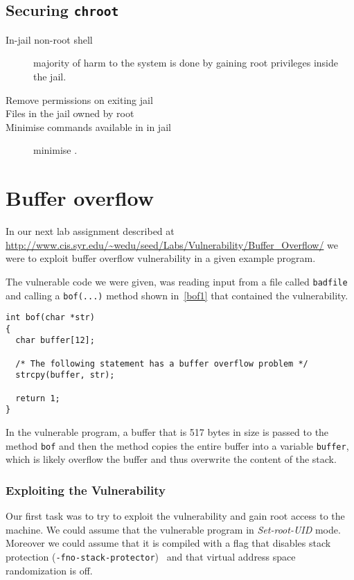 \documentclass[12pt, a4paper, pdflatex]{article}
\begin{document}
\subsection{Securing \texttt{chroot}}
\begin{description}
  \item[In-jail non-root shell] majority of harm to the system is done by gaining root privileges inside the jail.
  \item[Remove permissions on exiting jail] 
  \item[Files in the jail owned by root] 
  \item[Minimise commands available in in jail] minimise .
\end{description}

\section{Buffer overflow}

In our next lab assignment described at \url{http://www.cis.syr.edu/~wedu/seed/Labs/Vulnerability/Buffer_Overflow/} we were to exploit buffer overflow vulnerability in a given example program.

The vulnerable code we were given, was reading input from a file called \texttt{badfile} and calling a \texttt{bof(...)} method shown in~\ref{bof1} that contained the vulnerability.

\vspace{1em}
\lstset{
	captionpos=b,
	frame=single,
	language=C,
	breaklines=true,
	caption=Function with buffer overflow vulnerability,
	label=bof1,
}
\begin{lstlisting}
int bof(char *str)
{
  char buffer[12];

  /* The following statement has a buffer overflow problem */ 
  strcpy(buffer, str);

  return 1;
}
\end{lstlisting}
In the vulnerable program, a buffer that is 517 bytes in size is passed to the method \texttt{bof} and then the method copies the entire buffer into a variable \texttt{buffer}, which is likely overflow the buffer and thus overwrite the content of the stack.

\subsubsection{Exploiting the Vulnerability}

Our first task was to try to exploit the vulnerability and gain root access to the machine. We could assume that the vulnerable program in \emph{Set-root-UID} mode. Moreover we could assume that it is compiled with a flag that disables stack protection (\texttt{-fno-stack-protector})~\cite{gnu13} and that virtual address space randomization is off.
\end{document}
